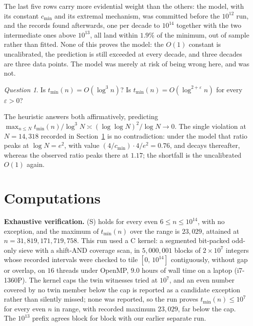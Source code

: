 \documentclass[10pt]{article}
\theoremstyle{definition}
\theoremstyle{remark}
\newtheorem{question}{Question}
\begin{document}
The last five rows carry more evidential weight than the others: the model,
with its constant $c_{\min}$ and its extremal mechanism, was committed before
the $10^{12}$ run, and the records found afterwards, one per decade to
$10^{14}$ together with the two intermediate ones above $10^{13}$, all land
within $1.9\%$ of the minimum, out of sample rather than fitted. None of this
proves the model: the $O(1)$ constant is uncalibrated, the prediction is still
exceeded at every decade, and three decades are three data points. The model
was merely at risk of being wrong here, and was not.

\begin{question}\label{q:main}
Is $t_{\min}(n) = O(\log^3 n)$? Is
$t_{\min}(n) = O(\log^{2+\varepsilon} n)$ for every $\varepsilon > 0$?
\end{question}

The heuristic answers both affirmatively, predicting
$\max_{n \le N} t_{\min}(n)/\log^3 N \asymp (\log\log N)^2/\log N \to 0$. The
single violation at $N = 14{,}318$ recorded in Section~\ref{sec:comp} is no
contradiction: under the model that ratio peaks at $\log N = e^2$, with value
$(4/c_{\min})\cdot 4/e^2 = 0.76$, and decays thereafter, whereas the observed
ratio peaks there at $1.17$; the shortfall is the uncalibrated $O(1)$ again.

\section{Computations}\label{sec:comp}

\textbf{Exhaustive verification.} (S) holds for every even
$6 \le n \le 10^{14}$, with no exception, and the maximum of
$t_{\min}(n)$ over the range is $23{,}029$, attained at
$n = 31{,}819{,}171{,}719{,}758$. This run used a C kernel: a
segmented bit-packed odd-only sieve with a shift-AND coverage scan, in
$5{,}000{,}001$ blocks of $2 \times 10^{7}$ integers whose recorded intervals
were checked to tile $[0,\, 10^{14}]$ contiguously, without gap or overlap, on
$16$ threads under OpenMP, $9.0$ hours of wall time on a laptop (i7-1360P).
The kernel caps the twin witnesses tried at $10^{7}$, and an even number
covered by no twin member below the cap is reported as a candidate exception
rather than silently missed; none was reported, so the run proves
$t_{\min}(n) \le 10^{7}$ for every even $n$ in range, with recorded maximum
$23{,}029$, far below the cap. The $10^{13}$ prefix agrees block for block
with our earlier separate run.
\end{document}

